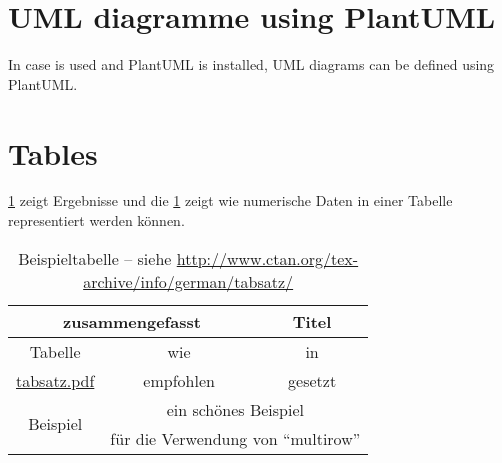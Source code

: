 \section{UML diagramme using PlantUML}

In case \lualatex{} is used and PlantUML is installed, UML diagrams can be defined using PlantUML.



\section{Tables}
\cref{tab:Ergebnisse} zeigt Ergebnisse und die \cref{tab:Ergebnisse} zeigt wie numerische Daten in einer Tabelle representiert werden können.
\begin{table}
  \centering
  \begin{tabular}{ccc}
    \toprule
    \multicolumn{2}{c}{\textbf{zusammengefasst}} & \textbf{Titel}                                                          \\ \midrule
    Tabelle                                      & wie                                                           & in      \\
    \url{tabsatz.pdf}                            & empfohlen                                                     & gesetzt \\

    \multirow{2}{*}{Beispiel}                    & \multicolumn{2}{c}{ein schönes Beispiel}                                \\
                                                 & \multicolumn{2}{c}{für die Verwendung von \enquote{multirow}}           \\
    \bottomrule
  \end{tabular}
  \caption[Beispieltabelle]{Beispieltabelle -- siehe \url{http://www.ctan.org/tex-archive/info/german/tabsatz/}}
  \label{tab:Ergebnisse}
\end{table}

